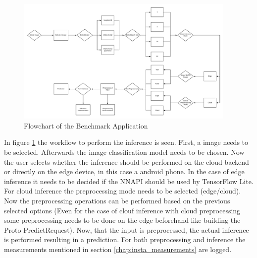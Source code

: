 \begin{figure}[htb]
\centering
\includegraphics[width=0.95\textwidth]{./Bilder/FlowChart_App.png}
\caption{Flowchart of the Benchmark Application}
\label{fig:app}
\end{figure}
In figure \ref{fig:app} the workflow to perform the inference is seen. First, a image needs to be selected. Afterwards the image classification model needs to be chosen. Now the user selects whether the inference should be performed on the cloud-backend or directly on the edge device, in this case a android phone. In the case of edge inference it needs to be decided if the NNAPI should be used by TensorFlow Lite. For cloud inference the preprocessing mode needs to be selected (edge/cloud). Now the preprocessing operations can be performed based on the previous selected options (Even for the case of clouf inference with cloud preprocessing some preprocessing needs to be done on the edge beforehand like building the Proto PredictRequest). Now, that the input is preprocessed, the actual inference is performed resulting in a prediction. For both preprocessing and inference the measurements mentioned in section \ref{chap:insta_measurements} are logged.

